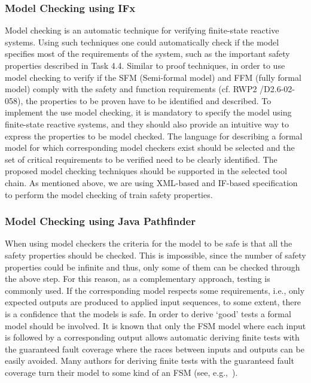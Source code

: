 \documentclass{template/openetcs_article}
\begin{document}
\subsubsection{Model Checking using IFx}
Model checking is an automatic technique for verifying finite-state reactive systems. Using such techniques one could automatically check if the model specifies most of the requirements of the system, such as the important safety properties described in Task 4.4. Similar to proof techniques, in order to use model checking to verify if the SFM (Semi-formal model) and FFM (fully formal model) comply with the safety and function requirements (cf. RWP2 /D2.6-02-058), the properties to be proven have to be identified and described. To implement the use model checking, it is mandatory to specify the model using finite-state reactive systems, and they should also provide an intuitive way to express the properties to be model checked. The language for describing a formal model for which corresponding model checkers exist should be selected and the set of critical requirements to be verified need to be clearly identified. The proposed model checking techniques should be supported in the selected tool chain. As mentioned above, we are using XML-based and IF-based specification to perform the model checking of train safety properties.




\subsubsection{Model Checking using Java Pathfinder}
When using model checkers the criteria for the model to be safe is that all the safety properties should be checked. This is impossible, since the number of safety properties could be infinite and thus, only some of them can be checked through the above step.
%
For this reason, as a complementary approach, testing is commonly used. If the corresponding model respects some requirements, i.e., only expected outputs are produced to applied input sequences, to some extent, there is a confidence that the models is safe. In order to derive ‘good’ tests a formal model should be involved. It is known that only the FSM model where each input is followed by a corresponding output allows automatic deriving finite tests with the guaranteed fault coverage where the races between inputs and outputs can be easily avoided.  Many authors for deriving finite tests with the guaranteed fault coverage turn their model to some kind of an FSM (see, e.g.,~\cite{springintveld2001testing,zymc11,Gromov2009}). 
\end{document}
